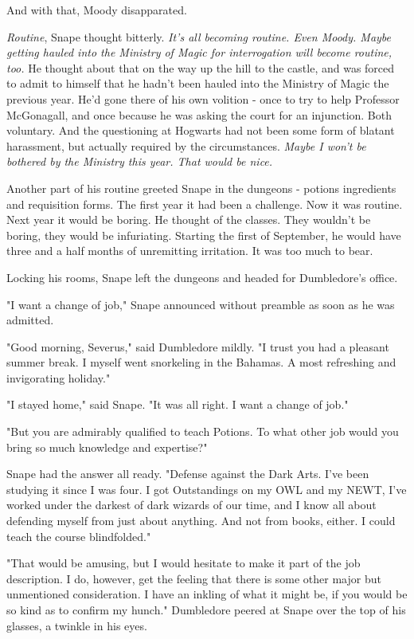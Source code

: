 \documentclass[a4paper,11pt]{article}
\begin{document}
And with that, Moody disapparated.

\emph{Routine}, Snape thought bitterly. \emph{It's all becoming routine. Even Moody. Maybe getting hauled into the Ministry of Magic for interrogation will become routine, too.} He thought about that on the way up the hill to the castle, and was forced to admit to himself that he hadn't been hauled into the Ministry of Magic the previous year. He'd gone there of his own volition - once to try to help Professor McGonagall, and once because he was asking the court for an injunction. Both voluntary. And the questioning at Hogwarts had not been some form of blatant harassment, but actually required by the circumstances. \emph{Maybe I won't be bothered by the Ministry this year. That would be nice.}

Another part of his routine greeted Snape in the dungeons - potions ingredients and requisition forms. The first year it had been a challenge. Now it was routine. Next year it would be boring. He thought of the classes. They wouldn't be boring, they would be infuriating. Starting the first of September, he would have three and a half months of unremitting irritation. It was too much to bear.

Locking his rooms, Snape left the dungeons and headed for Dumbledore's office.

"I want a change of job," Snape announced without preamble as soon as he was admitted.

"Good morning, Severus," said Dumbledore mildly. "I trust you had a pleasant summer break. I myself went snorkeling in the Bahamas. A most refreshing and invigorating holiday."

"I stayed home," said Snape. "It was all right. I want a change of job."

"But you are admirably qualified to teach Potions. To what other job would you bring so much knowledge and expertise?"

Snape had the answer all ready. "Defense against the Dark Arts. I've been studying it since I was four. I got Outstandings on my OWL and my NEWT, I've worked under the darkest of dark wizards of our time, and I know all about defending myself from just about anything. And not from books, either. I could teach the course blindfolded."

"That would be amusing, but I would hesitate to make it part of the job description. I do, however, get the feeling that there is some other major but unmentioned consideration. I have an inkling of what it might be, if you would be so kind as to confirm my hunch." Dumbledore peered at Snape over the top of his glasses, a twinkle in his eyes.
\end{document}
